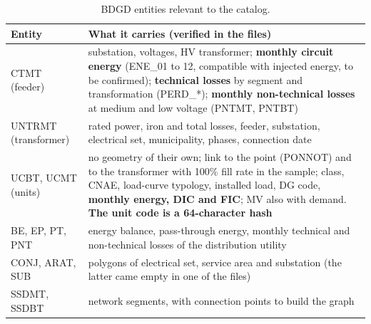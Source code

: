 \begin{table}[H]
\centering\small
\caption{BDGD entities relevant to the catalog.}
\begin{tabularx}{\textwidth}{P{3.2cm} L}
\toprule
\textbf{Entity} & \textbf{What it carries (verified in the files)} \\
\midrule
CTMT (feeder) & substation, voltages, HV transformer; \textbf{monthly circuit energy} (ENE\_01 to 12, compatible with injected energy, to be confirmed); \textbf{technical losses} by segment and transformation (PERD\_*); \textbf{monthly non-technical losses} at medium and low voltage (PNTMT, PNTBT) \\
UNTRMT (transformer) & rated power, iron and total losses, feeder, substation, electrical set, municipality, phases, connection date \\
UCBT, UCMT (units) & no geometry of their own; link to the point (PONNOT) and to the transformer with 100\% fill rate in the sample; class, CNAE, load-curve typology, installed load, DG code, \textbf{monthly energy, DIC and FIC}; MV also with demand. \textbf{The unit code is a 64-character hash} \\
BE, EP, PT, PNT & energy balance, pass-through energy, monthly technical and non-technical losses of the distribution utility \\
CONJ, ARAT, SUB & polygons of electrical set, service area and substation (the latter came empty in one of the files) \\
SSDMT, SSDBT & network segments, with connection points to build the graph \\
\bottomrule
\end{tabularx}
\end{table}


